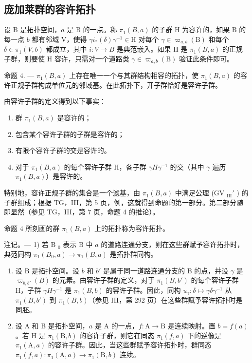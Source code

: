 \subsection{庞加莱群的容许拓扑}

设 B 是拓扑空间，\(a\) 是 B 的一点。称 \(\pi_1(B, a)\) 的子群 H 为容许的，如果 B 的每一点 \(b\) 都有邻域 V，使得 \(\gamma i_*(\delta)\gamma^{-1} \in \mathrm{H}\) 对每个 \(\gamma \in \varpi_{a,b}(\mathrm{B})\) 和每个 \(\delta \in \pi_1(V, b)\) 都成立，其中 \(i: V \to B\) 是典范嵌入。如果 H 是 \(\pi_1(B, a)\) 的正规子群，则要使 H 容许，只需对一个道路类 \(\gamma \in \varpi_{a,b}(\mathrm{B})\) 验证此条件即可。

命题 4. — \(\pi_1(B, a)\) 上存在唯一一个与其群结构相容的拓扑，使 \(\pi_1(B, a)\) 的容许正规子群构成单位元的邻域基。在此拓扑下，开子群恰好是容许子群。

由容许子群的定义得到以下事实：

\begin{enumerate}
\def\labelenumi{\alph{enumi})}
\item
  群 \(\pi_1(B, a)\) 是容许的；
\item
  包含某个容许子群的子群是容许的；
\item
  有限个容许子群的交是容许的。
\item
对于 \(\pi_{1}(B,a)\) 的每个容许子群 H，各子群 \(\gamma H\gamma^{-1}\) 的交（其中 \(\gamma\) 遍历 \(\pi_{1}(B,a)\)）是容许的。
\end{enumerate}

特别地，容许正规子群的集合是一个滤基，由 \(\pi_1(B,a)\) 中满足公理 (GV \(_{\text{III}}'\) ) 的子群组成；根据 TG，III，第 5 页，例，这就得到命题的第一部分。第二部分随即显然（参见 TG，III，第 7 页，命题 4 的推论）。

命题 4 所刻画的群 \(\pi_{1}(B,a)\) 上的拓扑称为容许拓扑。

注记。--- 1) 若 B \(_{0}\) 表示 B 中 \(a\) 的道路连通分支，则在这些群赋予容许拓扑时，典范同构 \(\pi_{1}(B_{0}, a) \to \pi_{1}(B, a)\) 是拓扑群同构。

\begin{enumerate}
\def\labelenumi{\arabic{enumi})}
\setcounter{enumi}{1}
\item
设 B 是拓扑空间。设 \(b\) 和 \(b'\) 是属于同一道路连通分支的 B 的点，并设 \(\gamma\) 是 \(\varpi_{b,b'}(B)\) 的元素。由容许子群的定义，对于 \(\pi_1(B,b')\) 的每个容许子群 H，子群 \(\gamma H\gamma^{-1}\) 是 \(\pi_1(B,b)\) 的容许子群。因此，同构 \(u_\gamma \colon \delta \mapsto \gamma \delta \gamma^{-1}\) 从 \(\pi_1(B,b')\) 到 \(\pi_1(B,b)\)（参见 III，第 292 页）在这些群赋予容许拓扑时是同胚。
\item
  设 A 和 B 是拓扑空间，\(a\) 是 A 的一点，\(f\colon\mathrm{A}\to\mathrm{B}\) 是连续映射。置 \(b=f(a)\)。若 H 是 \(\pi_{1}(\mathrm{B},b)\) 的容许子群，则它在同态 \(\pi_{1}(f,a)\) 下的逆像是 \(\pi_{1}(\mathrm{A},a)\) 的容许子群。因此，当这些群赋予容许拓扑时，群同态 \(\pi_{1}(f,a)\colon\pi_{1}(\mathrm{A},a)\to\pi_{1}(\mathrm{B},b)\) 连续。
\end{enumerate}

